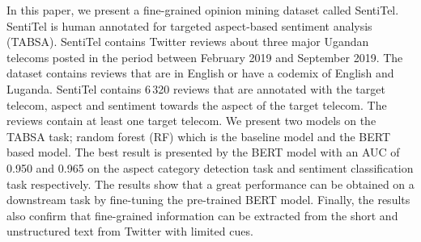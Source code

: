 In this paper, we present a fine-grained opinion mining dataset called SentiTel. SentiTel is human annotated for targeted aspect-based sentiment analysis (TABSA). SentiTel contains Twitter reviews about three major Ugandan telecoms posted in the period between February 2019 and September 2019. The dataset contains reviews that are in English or have a codemix of English and Luganda. SentiTel contains 6\,320 reviews that are annotated with the target telecom, aspect and sentiment towards the aspect of the target telecom. The reviews contain at least one target telecom. We present two models on the TABSA task; random forest (RF) which is the baseline model and the BERT based model. The best result is presented by the BERT model with an AUC of 0.950 and 0.965 on the aspect category detection task and sentiment classification task respectively. The results show that a great performance can be obtained on a downstream task by fine-tuning the pre-trained BERT model. Finally, the results also confirm that fine-grained information can be extracted from the short and unstructured text from Twitter with limited cues.
